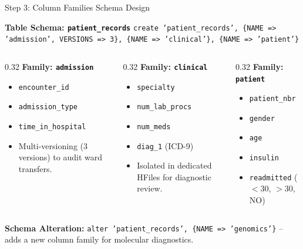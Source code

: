 \documentclass[aspectratio=169]{beamer}
\begin{document}
\begin{frame}{Step 3: Column Families Schema Design}
    \begin{block}{\textbf{Table Schema: \texttt{patient\_records}}}
        {\scriptsize\texttt{create 'patient\_records', \{NAME => 'admission', VERSIONS => 3\}, \{NAME => 'clinical'\}, \{NAME => 'patient'\}}}
    \end{block}
    \vspace{0.15cm}
    \begin{columns}[T]
        \begin{column}{0.32\textwidth}
            \textbf{\textcolor{NavyBlue}{Family: \texttt{admission}}}
            \begin{itemize}\scriptsize
                \item \texttt{encounter\_id}
                \item \texttt{admission\_type}
                \item \texttt{time\_in\_hospital}
                \item Multi-versioning (3 versions) to audit ward transfers.
            \end{itemize}
        \end{column}
        \begin{column}{0.32\textwidth}
            \textbf{\textcolor{NavyBlue}{Family: \texttt{clinical}}}
            \begin{itemize}\scriptsize
                \item \texttt{specialty}
                \item \texttt{num\_lab\_procs}
                \item \texttt{num\_meds}
                \item \texttt{diag\_1} (ICD-9)
                \item Isolated in dedicated HFiles for diagnostic review.
            \end{itemize}
        \end{column}
        \begin{column}{0.32\textwidth}
            \textbf{\textcolor{NavyBlue}{Family: \texttt{patient}}}
            \begin{itemize}\scriptsize
                \item \texttt{patient\_nbr}
                \item \texttt{gender}
                \item \texttt{age}
                \item \texttt{insulin}
                \item \texttt{readmitted} ($<$30, $>$30, NO)
            \end{itemize}
        \end{column}
    \end{columns}
    \vspace{0.2cm}
    {\scriptsize\textbf{Schema Alteration:} \texttt{alter 'patient\_records', \{NAME => 'genomics'\}} -- adds a new column family for molecular diagnostics.}
\end{frame}
\end{document}
